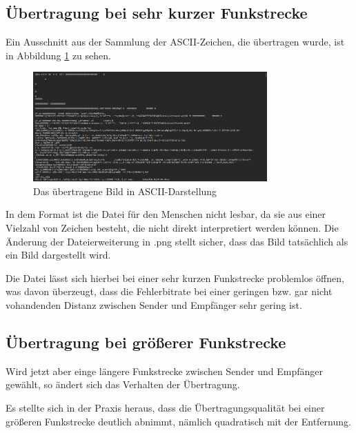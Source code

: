 \subsection{Übertragung bei sehr kurzer Funkstrecke}
Ein Ausschnitt aus der Sammlung der ASCII-Zeichen, die übertragen wurde, ist in Abbildung \ref{fig:Task2c} zu sehen.

\begin{figure}[H]
    \centering
    \includegraphics[width=0.8\textwidth]{Pictures/memeASCII.png}
    \caption{Das übertragene Bild in ASCII-Darstellung}
    \label{fig:Task2c}
\end{figure}

In dem Format ist die Datei für den Menschen nicht lesbar, da sie aus einer Vielzahl von Zeichen besteht, die nicht direkt interpretiert werden können. 
Die Änderung der Dateierweiterung in .png stellt sicher, dass das Bild tatsächlich als ein Bild dargestellt wird. 

Die Datei lässt sich hierbei bei einer sehr kurzen Funkstrecke problemlos öffnen, was davon überzeugt, dass die Fehlerbitrate bei einer geringen bzw. gar nicht vohandenden Distanz zwischen Sender und Empfänger sehr gering ist.

\subsection{Übertragung bei größerer Funkstrecke}
Wird jetzt aber einge längere Funkstrecke zwischen Sender und Empfänger gewählt, so ändert sich das Verhalten der Übertragung. 

Es stellte sich in der Praxis heraus, dass die Übertragungsqualität bei einer größeren Funkstrecke deutlich abnimmt, nämlich quadratisch mit der Entfernung.

